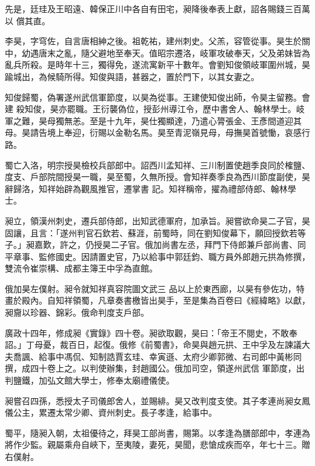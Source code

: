 \begin{pinyinscope}
 先是，廷珪及王昭遠、韓保正川中各自有田宅，昶降後奉表上獻，詔各賜錢三百萬以
 償其直。



 李昊，字穹佐，自言唐相紳之後。祖乾祐，建州刺史。父羔，容管從事。昊生於關中，幼遇唐末之亂，隨父避地至奉天。值昭宗遷洛，岐軍攻破奉天，父及弟妹皆為亂兵所殺。是時年十三，獨得免，遂流寓新平十數年。會劉知俊領岐軍圍州城，昊踰城出，為候騎所得。知俊與語，甚器之，置於門下，以其女妻之。



 知俊歸蜀，偽署遂州武信軍節度，以昊為從事。王建使知俊出師，令昊主留務。會建
 殺知俊，昊亦罷職。王衍襲偽位，授彭州導江令，歷中書舍人、翰林學士。岐軍之難，昊母獨無恙。至是十九年，昊仕獨顯達，乃遣心膂張金、王彥間道迎其母。昊請告境上奉迎，衍賜以金勒名馬。昊至青泥嶺見母，母撫昊首號慟，哀感行路。



 蜀亡入洛，明宗授昊檢校兵部郎中。詔西川孟知祥、三川制置使趙季良同於榷鹽、度支、戶部院間授昊一職，昊至蜀，久無所授。會知祥奏季良為西川節度副使，昊辭歸洛，知祥始辟為觀風推官，遷掌書
 記。知祥稱帝，擢為禮部侍郎、翰林學士。



 昶立，領漢州刺史，遷兵部侍郎，出知武德軍府，加承旨。昶嘗欲命昊二子官，昊固讓，且言：「遂州判官石欽若、蘇涯，前蜀時，同在劉知俊幕下，願回授欽若等子。」昶嘉歎，許之，仍授昊二子官。俄加尚書左丞，拜門下侍郎兼戶部尚書、同平章事、監修國史。因請置史官，乃以給事中郭廷鈞、職方員外郎趙元拱為修撰，雙流令崔崇構、成都主簿王中孚為直館。



 俄加昊左僕射。昶令就知祥真容院圖文武三
 品以上於東西廊，以昊有參佐功，特畫於殿內。自知祥領蜀，凡章奏書檄皆出昊手，至是集為百卷曰《經緯略》以獻，昶齎以珍器、錦彩。俄命判度支戶部。



 廣政十四年，修成昶《實錄》四十卷。昶欲取觀，昊曰：「帝王不閱史，不敢奉詔。」丁母憂，裁百日，起復。俄修《前蜀書》，命昊與趙元拱、王中孚及左諫議大夫喬諷、給事中馮侃、知制誥賈玄珪、幸寅遜、太府少卿郭微、右司郎中黃彬同撰，成四十卷上之。以判使辦集，封趙國公。俄加司空，領遂州武信
 軍節度，出判鹽鐵，加弘文館大學士，修奉太廟禮儀使。



 昶嘗召四孫，悉授太子司儀郎舍人，並賜緋。昊又改判度支使。其子孝連尚昶女鳳儀公主，累遷太常少卿、資州刺史。長子孝逢，給事中。



 蜀平，隨昶入朝，太祖優待之，拜昊工部尚書，賜第。以孝逢為膳部郎中，孝連為將作少監。親屬乘舟自峽下，至夷陵，妻死，昊聞，悲愴成疾而卒，年七十三。贈右僕射。




\end{pinyinscope}
